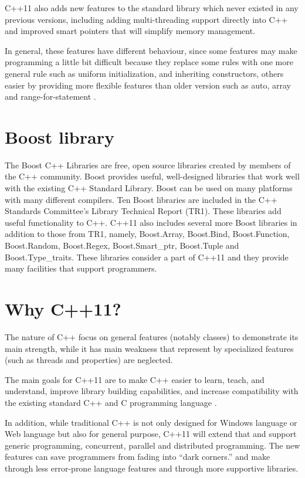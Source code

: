 \documentclass[12pt]{report}
\begin{document}
C++11 also adds new features to the standard library which never existed in any previous versions, including adding multi-threading support directly into C++ and improved smart pointers that will simplify memory management. 

In general, these features have different behaviour, since some features may make programming a little bit difficult because they replace some rules with one more general rule such as uniform initialization,  and inheriting constructors, others easier by providing more flexible features than older version such as auto, array and range-for-statement \cite{Stroustrup:2012:Cpp11}.

	

\section{Boost library}
\label{section: Boost library}
The Boost C++ Libraries are free, open source libraries created by members of the C++ community. Boost provides useful, well-designed libraries that work well with the existing C++ Standard Library. Boost can be used on many platforms with many different compilers. Ten Boost libraries are included in the C++ Standards Committee's Library Technical Report (TR1). These libraries add useful functionality to C++.  C++11 also includes several more Boost libraries in addition to those from TR1, namely, Boost.Array, Boost.Bind, Boost.Function, Boost.Random, Boost.Regex, Boost.Smart\_ptr, Boost.Tuple and Boost.Type\_traits. These libraries consider a part of C++11 and they provide many facilities that support programmers\cite{Deitel:2012:CPP}.


\section{Why C++11?}
\label{secton: Why C++11}
The nature of C++ focus on general features (notably classes) to demonstrate its main strength, while it has main weakness that represent by specialized features (such as threads and properties) are neglected.

The main goals for C++11 are to make C++ easier to learn, teach, and understand, improve library building capabilities, and increase compatibility with the existing standard C++ and C programming language \cite{Deitel:2012:CPP}.

In addition, while traditional C++ is not only designed for Windows language or Web language but also for general purpose, C++11 will extend that and support generic programming, concurrent, parallel and distributed programming. 
The new features can save programmers from fading into “dark corners.” and make through less error-prone language features and through more supportive libraries.
\end{document}
